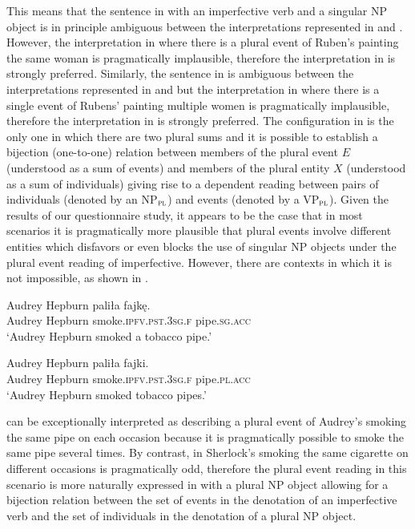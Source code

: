 \documentclass[output=paper]{langscibook}
\begin{document}
This means that the sentence in  with an imperfective verb and a singular NP object is in principle ambiguous between the interpretations represented in  and . However, the interpretation in  where there is a plural event of Ruben’s painting the same woman is pragmatically implausible, therefore the interpretation in  is strongly preferred. Similarly, the sentence in  is ambiguous between the interpretations represented in  and  but the interpretation in  where there is a single event of Rubens’ painting multiple women is pragmatically implausible, therefore the interpretation in  is strongly preferred. The configuration in  is the only one in which there are two plural sums and it is possible to establish a bijection (one-to-one) relation between members of the plural event $E$ (understood as a sum of events) and members of the plural entity $X$ (understood as a sum of individuals) giving rise to a dependent reading between pairs of individuals (denoted by an NP$_\textsc{pl}$) and events (denoted by a VP$_\textsc{pl}$). Given the results of our questionnaire study, it appears to be the case that in most scenarios it is pragmatically more plausible that plural events involve different entities which disfavors or even blocks the use of singular NP objects under the plural event reading of imperfective. However, there are contexts in which it is not impossible, as shown in .

\ea\label{jan-bla:fansb:kb:ex23}
\gll Audrey Hepburn paliła fajkę.\\  
     Audrey Hepburn smoke.\textsc{ipfv.pst.3sg.f} pipe.\textsc{sg.acc}\\
\glt ‘Audrey Hepburn smoked a tobacco pipe.’
\z

\ea\label{jan-bla:fansb:kb:ex24}
\gll Audrey Hepburn paliła fajki.\\  
      Audrey Hepburn smoke.\textsc{ipfv}.\textsc{pst}.\textsc{3sg}.\textsc{f} pipe.\textsc{pl}.\textsc{acc}\\
\glt ‘Audrey Hepburn smoked tobacco pipes.’
\z

\noindent {} can be exceptionally interpreted as describing a plural event of Audrey’s smoking the same pipe on each occasion because it is pragmatically possible to smoke the same pipe several times. By contrast, in  Sherlock’s smoking the same cigarette on different occasions is pragmatically odd, therefore the plural event reading in this scenario is more naturally expressed in  with a plural NP object allowing for a bijection relation between the set of events in the denotation of an imperfective verb and the set of individuals in the denotation of a plural NP object.  
\end{document}
